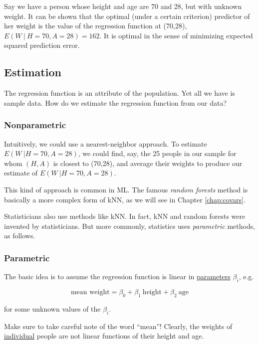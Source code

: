 Say we have a person whose height and age are 70 and 28, but with
unknown weight.  It can be shown that the optimal (under a certain
criterion) predictor of her weight is the value of the regression
function at (70,28), $E(W ~|~ H=70, A=28) = 162$.  It is optimal
in the sense of minimizing expected squared prediction error.

\subsection{Estimation}

The regression function is an attribute of the population.  Yet all we
have is sample data.  How do we estimate the regression function from
our data?

\subsubsection{Nonparametric}

Intuitively, we could use a nearest-neighbor approach.  To estimate
$E(W ~| H=70, A=28)$, we could find, say, the 25 people in our
sample for whom $(H,A)$ is closest to (70,28), and average their weights
to produce our estimate of $E(W ~| H=70, A=28)$.  

This kind of approach is common in ML.  The famous \textit{random
forests} method is basically a more complex form of kNN, as we will see
in Chapter \ref{chap:covars}.  

Statisticians also use methods like kNN.  In fact, kNN and random
forests were invented by statisticians.  But more commonly, statistics
uses \textit{parametric} methods, as follows.

\subsubsection{Parametric}

The basic idea is to assume the regression function is linear in
\underline{parameters} $\beta_i$, e.g.

\begin{equation}
\label{wthtage}
\textrm{mean weight} = \beta_0 + \beta_1 ~ \textrm{height} + \beta_2 ~ \textrm{age}
\end{equation}

for some unknown values of the $\beta_i$.

Make sure to take careful note of the word ``mean''!  Clearly, the
weights of \underline{individual} people are not linear functions of
their height and age.

